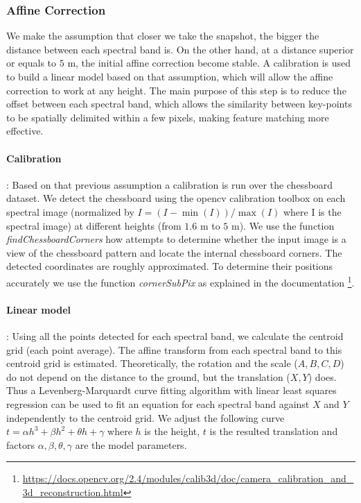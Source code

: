 \documentclass[a4paper,twoside]{article}
\begin{document}
	\newpage
	\subsubsection{Affine Correction}
	\label{sec:affine}
	
	We make the assumption that closer we take the snapshot, the bigger the distance between each spectral band is. %
	On the other hand, at a distance superior or equals to $5$ m, the initial affine correction become stable. %
	A calibration is used to build a linear model based on that assumption, which will allow the affine correction to work at any height.
	The main purpose of this step is to reduce the offset between each spectral band,
	which allows the similarity between key-points to be spatially delimited within a few pixels, making feature matching more effective.
	
	\paragraph{Calibration} :
	Based on that previous assumption a calibration is run over the chessboard dataset.
	We detect the chessboard using the opencv calibration toolbox \cite{Bouguet2001CameraCT}
	on each spectral image (normalized by $I = (I-\min(I))/\max(I)$ where I is the spectral image) at different heights (from $1.6$ m to $5$ m).
	We use the function \textit{findChessboardCorners} how attempts to determine whether the input image is a view of the chessboard pattern and locate the internal chessboard corners.
	The detected coordinates are roughly approximated. To determine their positions accurately we use the function \textit{cornerSubPix} as explained in the documentation \footnote{\url{https://docs.opencv.org/2.4/modules/calib3d/doc/camera_calibration_and_3d_reconstruction.html}}.
	
	\paragraph{Linear model} :
	Using all the points detected for each spectral band, we calculate the centroid grid (each point average).
	The affine transform from each spectral band to this centroid grid is estimated.
	Theoretically, the rotation and the scale ($A,B,C,D$) do not depend on the distance to the ground, but the translation ($X,Y$) does.
	Thus a Levenberg-Marquardt curve fitting algorithm with linear least squares regression \cite{More78}
	can be used to fit an equation for each spectral band against $X$ and $Y$ independently to the centroid grid.
	We adjust the following curve $t = \alpha h^3 + \beta h^2 + \theta h + \gamma$ where $h$ is the height,
	$t$ is the resulted translation and factors $\alpha,\beta,\theta,\gamma$ are the model parameters.
	
\end{document}
